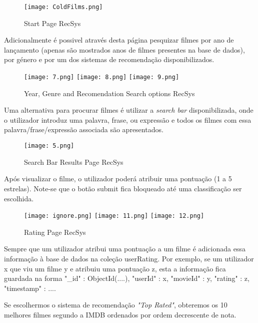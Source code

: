 \begin{figure}[H]
\centering
\texttt{[image: ColdFilms.png]}
\caption {Start Page RecSys}
\label {fig10}
\end{figure}

Adicionalmente é possivel através desta página pesquizar filmes por ano de lançamento (apenas são mostrados anos de filmes presentes na base de dados), por género e por um dos sistemas de recomendação disponibilizados.\newline


\begin{figure}[H]
\centering
\texttt{[image: 7.png]}
\texttt{[image: 8.png]}
\texttt{[image: 9.png]}
\caption {Year, Genre and Recomendation Search options RecSys}
\label {fig11}
\end{figure}

Uma alternativa para procurar filmes é utilizar a \textit{search bar} disponibilizada, onde o utilizador introduz uma palavra, frase, ou expressão e todos os filmes com essa palavra/frase/expressão associada são apresentados.\newline

\begin{figure}[H]
\centering
\texttt{[image: 5.png]}
\caption {Search Bar Results Page RecSys}
\label {fig12}
\end{figure}

Após visualizar o filme, o utilizador poderá atribuir uma pontuação (1 a 5 estrelas). Note-se que o botão submit fica bloqueado até uma classificação ser escolhida.

\begin{figure}[H]
\centering
\texttt{[image: ignore.png]}
\texttt{[image: 11.png]}
\texttt{[image: 12.png]}
\caption {Rating Page RecSys}
\label {fig13}
\end{figure}


Sempre que um utilizador atribui uma pontuação a um filme é adicionada essa informação à base de dados na coleção userRating. Por exemplo, se um utilizador x que viu um filme y e atribuiu uma pontuação z, esta a informação fica guardada na forma {"\_id" : ObjectId(....), "userId" : x, "movieId" : y, "rating" : z, "timestamp" : ...}.\newline


\par Se escolhermos o sistema de recomendação \textit{"Top Rated"}, obteremos os 10 melhores filmes segundo a IMDB ordenados por ordem decrescente de nota.\newline


